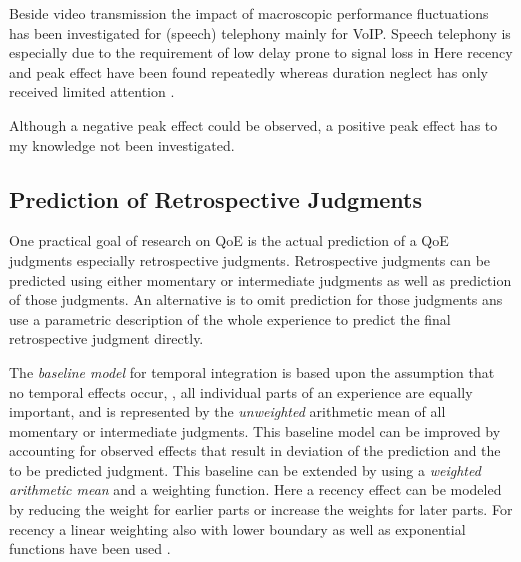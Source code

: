 Beside video transmission the impact of macroscopic performance fluctuations has been investigated for (speech) telephony mainly for \ac{VoIP}.
Speech telephony is especially due to the requirement of low delay prone to signal loss in 
Here recency and peak effect have been found repeatedly \citep[\cf,][]{rosenbluth_testing_1998, hamberg_time-varying_1999, gros_instantaneous_2001, gros_effects_2004, belmudez_assessment_2014, weiss_modeling_2009, lewcio_management_2012} whereas duration neglect has only received limited attention \citep[\cf,][]{rosenbluth_testing_1998}.

Although a negative peak effect could be observed, a positive peak effect has to my knowledge not been investigated.

\subsection{Prediction of Retrospective Judgments}
One practical goal of research on \ac{QoE} is the actual prediction of a \ac{QoE} judgments especially retrospective judgments.
Retrospective judgments can be predicted using either momentary or intermediate judgments as well as prediction of those judgments.
An alternative is to omit prediction for those judgments ans use a parametric description of the whole experience to predict the final retrospective judgment directly.

The \emph{baseline model} for temporal integration is based upon the assumption that no temporal effects occur, \ie, all individual parts of an experience are equally important, and is represented by the \emph{unweighted} arithmetic mean of all momentary or intermediate judgments.
This baseline model can be improved by accounting for observed effects that result in deviation of the prediction and the to be predicted judgment.
This baseline can be extended by using a \emph{weighted arithmetic mean} and a weighting function.
Here a recency effect can be modeled by reducing the weight for earlier parts \citep[\cf,][]{rosenbluth_testing_1998, weiss_modeling_2009, hamberg_time-varying_1999} or increase the weights for later parts.
For recency a linear weighting also with lower boundary \citep[\eg,][]{weiss_modeling_2009} as well as exponential functions have been used \cite[\eg,][]{hamberg_time-varying_1999}.

